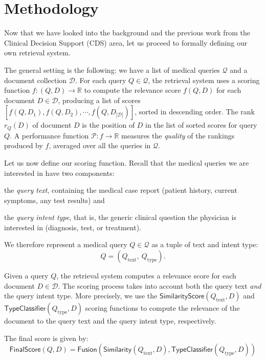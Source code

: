 \chapter{Methodology}\label{meth}

Now that we have looked into the background and the previous work from the Clinical Decision Support (CDS) area,
let us proceed to formally defining our own retrieval system. 

The general setting is the following: we have a list of medical queries $\mathcal{Q}$ and a document collection $\mathcal{D}$.
For each query $Q \in \mathcal{Q}$, 
the retrieval system uses a scoring function $f:(Q,D)\rightarrow\mathbb{R}$ to compute the relevance score $f(Q,D)$ 
for each
document $D\in\mathcal{D}$, producing a list of scores $[f(Q,D_1), f(Q,D_2), \cdots, f(Q,D_{|\mathcal{D}|})]$,
sorted in descending order.
The rank $r_Q(D)$ of document $D$ is the position of $D$ in the list of sorted scores for query $Q$.
A performance function $\mathcal{P}:f\rightarrow\mathbb{R}$ measures the \emph{quality} of the rankings produced by
$f$, averaged over all the queries in $ \mathcal{Q}$.

Let us now define our scoring function.
Recall that the medical queries we are interested in have two components:
\begin{enumerate*}[label=\arabic*)]
 \item the \emph{query text}, containing the medical case report (patient history, current symptoms, any test results) and
 \item the \emph{query intent type}, that is, the generic clinical question the physician is interested in (diagnosis, test, or treatment).
\end{enumerate*}
We therefore represent a medical query $Q\in\mathcal{Q}$ as a tuple of text and intent type: \[Q = \left(Q_{\text{text}},\ Q_{\text{type}}\right).\]

Given a query $Q$, the retrieval system computes a relevance score for each document $D\in\mathcal{D}$.
The scoring process takes into account both the query text \emph{and} the query intent type. More precisely, we use the
$\textsf{SimilarityScore}(Q_{\text{text}}, D)$ and $\textsf{TypeClassifier}(Q_{\text{type}}, D)$ scoring functions to compute the relevance of the document to the query text and the
query intent type, respectively.

The final score is given by:
\begin{equation}\label{fusion}
  \textsf{FinalScore}(Q, D) = \textsf{Fusion}\left(\textsf{Similarity}(Q_{\text{text}}, D), \textsf{TypeClassifier}(Q_{\text{type}}, D)\right)
\end{equation}

